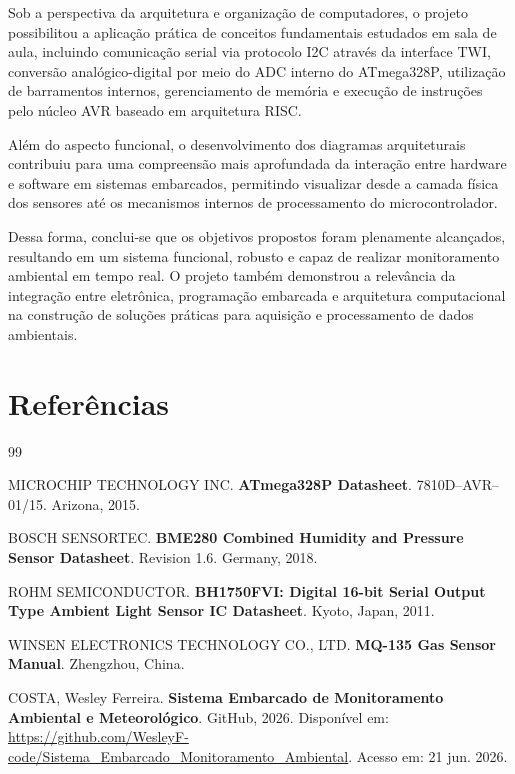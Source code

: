 \documentclass[a4paper,12pt]{article}
\begin{document}
Sob a perspectiva da arquitetura e organização de computadores, o projeto possibilitou a aplicação prática de conceitos fundamentais estudados em sala de aula, incluindo comunicação serial via protocolo I2C através da interface TWI, conversão analógico-digital por meio do ADC interno do ATmega328P, utilização de barramentos internos, gerenciamento de memória e execução de instruções pelo núcleo AVR baseado em arquitetura RISC.

Além do aspecto funcional, o desenvolvimento dos diagramas arquiteturais contribuiu para uma compreensão mais aprofundada da interação entre hardware e software em sistemas embarcados, permitindo visualizar desde a camada física dos sensores até os mecanismos internos de processamento do microcontrolador.

Dessa forma, conclui-se que os objetivos propostos foram plenamente alcançados, resultando em um sistema funcional, robusto e capaz de realizar monitoramento ambiental em tempo real. O projeto também demonstrou a relevância da integração entre eletrônica, programação embarcada e arquitetura computacional na construção de soluções práticas para aquisição e processamento de dados ambientais.

\renewcommand{\refname}{}
\section{Referências}
\begin{thebibliography}{99}

MICROCHIP TECHNOLOGY INC. \textbf{ATmega328P Datasheet}. 7810D--AVR--01/15. Arizona, 2015.

BOSCH SENSORTEC. \textbf{BME280 Combined Humidity and Pressure Sensor Datasheet}. Revision 1.6. Germany, 2018.

ROHM SEMICONDUCTOR. \textbf{BH1750FVI: Digital 16-bit Serial Output Type Ambient Light Sensor IC Datasheet}. Kyoto, Japan, 2011.

WINSEN ELECTRONICS TECHNOLOGY CO., LTD. \textbf{MQ-135 Gas Sensor Manual}. Zhengzhou, China.

COSTA, Wesley Ferreira. \textbf{Sistema Embarcado de Monitoramento Ambiental e Meteorológico}. GitHub, 2026. Disponível em: \url{https://github.com/WesleyF-code/Sistema_Embarcado_Monitoramento_Ambiental}. Acesso em: 21 jun. 2026.

\end{thebibliography}
\end{document}
